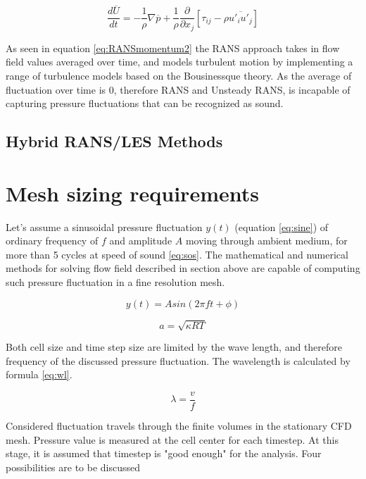 \begin{equation} \label{eq:RANSmomentum2}
\frac{d \overline{U}}{dt}
=
- \frac{1}{\rho} \nabla \overline{p}
+ \frac{1}{\rho} \frac{\partial}{\partial x_j} \left[ \tau_{ij} - \rho \overline{u'_i u'_j} \right]
\end{equation}

As seen in equation \ref{eq:RANSmomentum2} the RANS approach takes in flow field values averaged over time, and models turbulent motion by implementing a range of turbulence models based on the Bousinessque theory. As the average of fluctuation over time is 0, therefore RANS and Unsteady RANS, is incapable of capturing pressure fluctuations that can be recognized as sound.

\subsection{Hybrid RANS/LES Methods}



\section{Mesh sizing requirements} \label{meshsize}
Let's assume a sinusoidal pressure fluctuation $y(t)$ (equation \ref{eq:sine}) of ordinary frequency of $f$ and amplitude $A$ moving through ambient medium, for more than 5 cycles at speed of sound \ref{eq:sos}. The mathematical and numerical methods for solving flow field described in section above are capable of computing such pressure fluctuation in a fine resolution mesh. 

\begin{equation} \label{eq:sine}
y(t) = A sin(2 \pi f t + \phi)
\end{equation}

\begin{equation} \label{eq:sos}
a = \sqrt{\kappa R T}
\end{equation}

Both cell size and time step size are limited by the wave length, and therefore frequency of the discussed pressure fluctuation. The wavelength is calculated by formula \ref{eq:wl}.

\begin{equation} \label{eq:wl}
\lambda = \frac{v}{f}
\end{equation}

Considered fluctuation travels through the finite volumes in the stationary CFD mesh. Pressure value is measured at the cell center for each timestep. At this stage, it is assumed that timestep is "good enough" for the analysis. Four possibilities are to be discussed 

